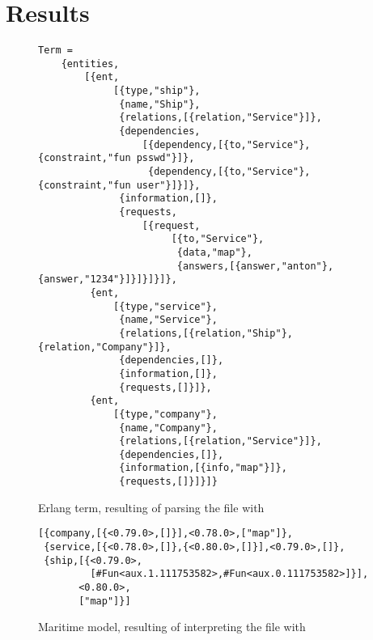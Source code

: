 \chapter{Results}



\begin{figure}
	\centering
	\begin{lstlisting}[keywordstyle={}]
Term =
    {entities,
        [{ent,
             [{type,"ship"},
              {name,"Ship"},
              {relations,[{relation,"Service"}]},
              {dependencies,
                  [{dependency,[{to,"Service"},{constraint,"fun psswd"}]},
                   {dependency,[{to,"Service"},{constraint,"fun user"}]}]},
              {information,[]},
              {requests,
                  [{request,
                       [{to,"Service"},
                        {data,"map"},
                        {answers,[{answer,"anton"},{answer,"1234"}]}]}]}]},
         {ent,
             [{type,"service"},
              {name,"Service"},
              {relations,[{relation,"Ship"},{relation,"Company"}]},
              {dependencies,[]},
              {information,[]},
              {requests,[]}]},
         {ent,
             [{type,"company"},
              {name,"Company"},
              {relations,[{relation,"Service"}]},
              {dependencies,[]},
              {information,[{info,"map"}]},
              {requests,[]}]}]}
	\end{lstlisting}
	\caption{Erlang term, resulting of parsing the file  with }
	\label{fig:protocolParsed}
\end{figure}


\begin{figure}
	\centering
	\begin{lstlisting}[keywordstyle={}]
[{company,[{<0.79.0>,[]}],<0.78.0>,["map"]},
 {service,[{<0.78.0>,[]},{<0.80.0>,[]}],<0.79.0>,[]},
 {ship,[{<0.79.0>,
         [#Fun<aux.1.111753582>,#Fun<aux.0.111753582>]}],
       <0.80.0>,
       ["map"]}]
	\end{lstlisting}
	\caption{Maritime model, resulting of interpreting the file  with }
	\label{fig:protocolParsedInterpreted}
\end{figure}
